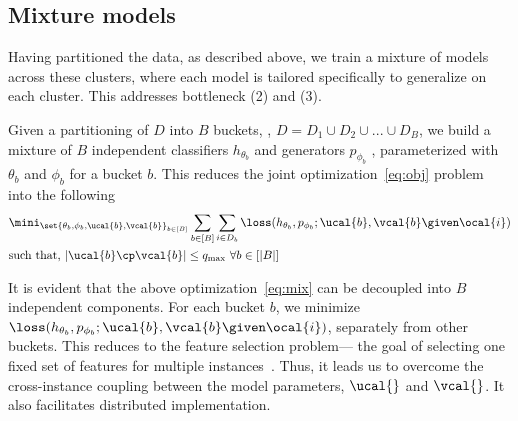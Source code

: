 \documentclass[letterpaper]{article}
\renewcommand{\cite}{\citep}
\begin{document}
\subsection{Mixture models}
Having partitioned the data, as described above, we train a mixture of models across these clusters, where each model is tailored specifically to generalize on each cluster. This addresses bottleneck (2) and (3).


 Given a partitioning of $D$ into $B$ buckets, \ie,  $D = D_1 \cup D_2 \cup ... \cup D_B$, we build a mixture of $B$ independent classifiers $h_{\theta_b} $ and generators  $  p_{\phi_b}$ , parameterized with $\theta_b$ and $\phi_b$ for a bucket $b$. This reduces the joint optimization~\eqref{eq:obj} problem into the following
\begin{align}
& \mini_{\set{\theta_b,\phi_b,\ucal{b},\vcal{b}}_{b\in [B]}} \sum_{b\in [B]}\sum_{i\in D_b}\loss(h_{\theta_b},p_{\phi_b};\ucal{b}, \vcal{b} \given \ocal{i}) \nonumber \\
& \text{such that,} \   |\ucal{b} \cp \vcal{b}| \le q_{\max}  \ \forall b\in [|B|]  \label{eq:mix}
\end{align}

It is evident that the above optimization~\eqref{eq:mix} can be decoupled into $B$ independent components. For each bucket $b$, we minimize $\loss(h_{\theta_b},p_{\phi_b};\ucal{b} , \vcal{b} \given \ocal{i})$, separately from other buckets.  This reduces to the feature selection problem--- the goal of selecting one fixed set of features for multiple instances~\cite{elenberg2018restricted}. Thus, it leads us to overcome the cross-instance coupling between the model parameters, $\ucal{}$ and $\vcal{}$. It also facilitates distributed implementation.
\end{document}
